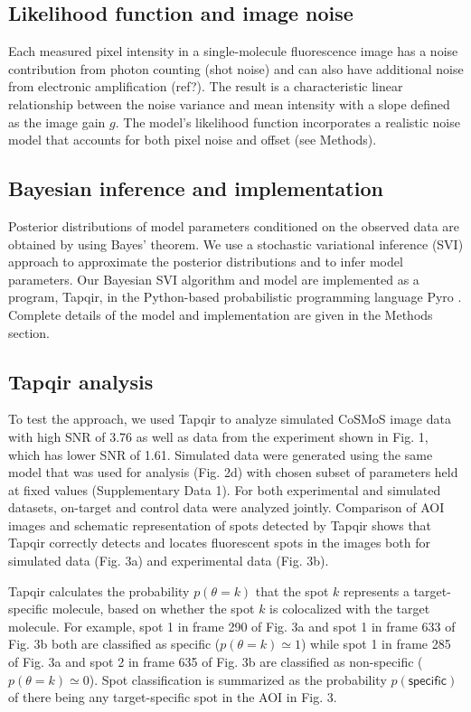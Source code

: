 \subsection*{Likelihood function and image noise}

Each measured pixel intensity in a single-molecule fluorescence image has a noise contribution from photon counting (shot noise) and can also have additional noise from electronic amplification (ref?). The result is  a characteristic linear relationship between the noise variance and  mean intensity with a slope defined as the image gain $g$. The model's likelihood function incorporates a realistic noise model that accounts for both pixel noise and offset (see Methods). 

\subsection*{Bayesian inference and implementation}

Posterior distributions of model parameters conditioned on the observed data are obtained by using Bayes' theorem. We use a stochastic variational inference (SVI) approach to approximate the posterior distributions and to infer model parameters. Our Bayesian SVI algorithm and model are implemented as a program, Tapqir, in the Python-based probabilistic programming language Pyro \cite{Bingham2019-qy}. Complete details of the model and implementation are given in the Methods section.

\subsection*{Tapqir analysis} %

To test the approach, we used Tapqir to analyze simulated CoSMoS image data with high SNR of 3.76 as well as data from the experiment shown in Fig. 1, which has lower SNR of 1.61. Simulated data were generated using the same model that was used for analysis (Fig. 2d) with chosen subset of parameters held at fixed values (Supplementary Data 1). For both experimental and simulated datasets, on-target and control data were analyzed jointly. Comparison of AOI images and schematic representation of spots detected by Tapqir shows that Tapqir correctly detects and locates fluorescent spots in the images both for simulated data (Fig. 3a) and experimental data (Fig. 3b).

Tapqir calculates the probability $p(\theta=k)$ that the spot $k$ represents a target-specific molecule, based on whether the spot $k$ is colocalized with the target molecule.  For example, spot 1 in frame 290 of Fig. 3a and spot 1 in frame 633 of Fig. 3b both are classified as specific ($p(\theta=k) \simeq 1$) while spot 1 in frame 285 of Fig. 3a and spot 2 in frame 635 of Fig. 3b are classified as non-specific ($p(\theta=k) \simeq 0$). Spot classification is summarized as the probability  $p(\mathsf{specific})$ of there being any target-specific spot in the AOI in Fig. 3. 


